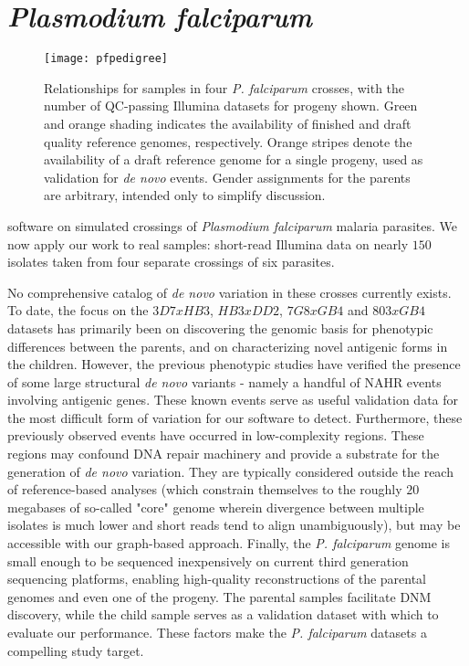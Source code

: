 \chapter{\textit{Plasmodium falciparum}}
\label{ch:pf}

\begin{figure}[h!]
  \centering
    \texttt{[image: pfpedigree]}
  \caption{Relationships for samples in four \textit{P. falciparum} crosses, with the number of QC-passing Illumina datasets for progeny shown.  Green and orange shading indicates the availability of finished and draft quality reference genomes, respectively.  Orange stripes denote the availability of a draft reference genome for a single progeny, used as validation for \textit{de novo} events.  Gender assignments for the parents are arbitrary, intended only to simplify discussion.}
  \label{fig:pfpedigree}
\end{figure}

 software on simulated crossings of \textit{Plasmodium falciparum} malaria parasites.  We now apply our work to real samples: short-read Illumina data on nearly $150$ isolates taken from four separate crossings of six parasites.

No comprehensive catalog of \textit{de novo} variation in these crosses currently exists.  To date, the focus on the $3D7xHB3$, $HB3xDD2$, $7G8xGB4$ and $803xGB4$ datasets has primarily been on discovering the genomic basis for phenotypic differences between the parents, and on characterizing novel antigenic forms in the children.  However, the previous phenotypic studies have verified the presence of some large structural \textit{de novo} variants - namely a handful of NAHR events involving antigenic genes.  These known events serve as useful validation data for the most difficult form of variation for our software to detect.  Furthermore, these previously observed events have occurred in low-complexity regions.  These regions may confound DNA repair machinery and provide a substrate for the generation of \textit{de novo} variation.  They are typically considered outside the reach of reference-based analyses (which constrain themselves to the roughly $20$ megabases of so-called "core" genome wherein divergence between multiple isolates is much lower and short reads tend to align unambiguously\cite{Miles:2015in}), but may be accessible with our graph-based approach.  Finally, the \textit{P. falciparum} genome is small enough to be sequenced inexpensively on current third generation sequencing platforms, enabling high-quality reconstructions of the parental genomes and even one of the progeny.  The parental samples facilitate DNM discovery, while the child sample serves as a validation dataset with which to evaluate our performance.  These factors make the \textit{P. falciparum} datasets a compelling study target.

